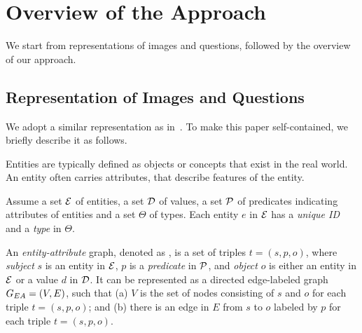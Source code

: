 \section{Overview of the Approach}
\label{sec-overview}


We start from representations of images and questions, followed by the overview of our approach.


\subsection{Representation of Images and Questions}
\label{sec-representation}

We adopt a similar representation as in~\cite{peixi2019}. To make this paper self-contained, we briefly describe it as follows.

 Entities are typically defined as objects or concepts that exist in the real world. An entity often carries attributes, that describe features of the entity. 

Assume a set ${\cal E}$ of entities, a set ${\cal D}$ of values, a set ${\cal P}$ of predicates indicating attributes of entities and a set $\Theta$ of types. 
Each entity $e$ in ${\cal E}$ has a {\em unique ID} and a {\em type} in $\Theta$.

An {\em entity-attribute} graph, denoted as , is a set of triples $t = (s, p, o)$, where {\em subject} $s$ is an entity in ${\cal E}$, $p$ is a {\em predicate} in ${\cal P}$, and {\em object} $o$ is either an entity in ${\cal E}$ or a value $d$ in ${\cal D}$. It can be represented as a directed edge-labeled graph $G_{EA}=(V, E)$, such that (a) $V$ is the set of nodes consisting of $s$ and $o$ for each triple $t = (s, p, o)$; and (b) there is an edge in $E$ from $s$ to $o$ labeled by $p$ for each triple $t = (s, p, o)$. 




